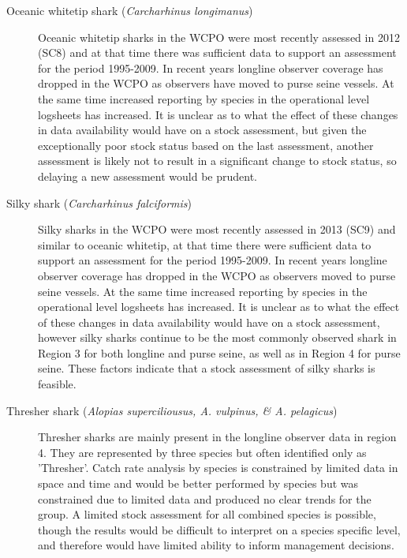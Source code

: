 \documentclass[12pt]{SCreport}
\begin{document}
\begin{description}
 
 \item[Oceanic whitetip shark (\emph{Carcharhinus longimanus})] Oceanic whitetip sharks in the WCPO were most recently assessed in 2012 (SC8) and at that time there was sufficient data to support an assessment for the period 1995-2009. In recent years longline observer coverage has dropped in the WCPO as observers have moved to purse seine vessels. At the same time increased reporting by species in the operational level logsheets has increased. It is unclear as to what the effect of these changes in data availability would have on a stock assessment, but given the exceptionally poor stock status based on the last assessment, another assessment is likely not to result in a significant change to stock status, so delaying a new assessment would be prudent.

\item[Silky  shark (\emph{Carcharhinus falciformis})] Silky sharks in the WCPO were most recently assessed in 2013 (SC9) and similar to oceanic whitetip, at that time there were sufficient data to support an assessment for the period 1995-2009. In recent years longline observer coverage has dropped in the WCPO as observers moved to purse seine vessels. At the same time increased reporting by species in the operational level logsheets has increased. It is unclear as to what the effect of these changes in data availability would have on a stock assessment, however silky sharks continue to be the most commonly observed shark in Region 3 for both longline and purse seine, as well as in Region 4 for purse seine. These factors indicate that a stock assessment of silky sharks is feasible.

\item[Thresher shark (\emph{Alopias superciliousus, A. vulpinus, \& A. pelagicus})]  Thresher sharks are mainly present in the longline observer data in region 4. %
They are represented by three species but often identified only as 'Thresher'.   Catch rate analysis by species is constrained by limited data in space and time and would be better performed by species but was constrained due to limited data and produced no clear trends for the group. A limited stock assessment for all combined species is possible, though the results would be difficult to interpret on a species specific level, and therefore would have limited ability to inform management decisions.


\end{description}
\end{document}
